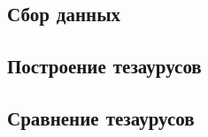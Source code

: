 \documentclass[coursework]{SCWorks}
\begin{document}
\subsection{Сбор данных}
\subsection{Построение тезаурусов}
\subsection{Сравнение тезаурусов}

\conclusion





\appendix
\end{document}
